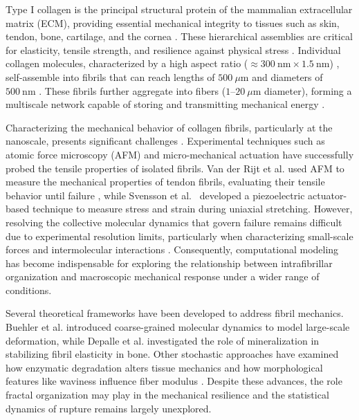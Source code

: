 \documentclass[aps,physrev,preprint,groupedaddress,linenumbers]{revtex4-2}
\begin{document}
Type I collagen is the principal structural protein of the mammalian extracellular matrix (ECM), providing essential mechanical integrity to tissues such as skin, tendon, bone, cartilage, and the cornea \cite{Silver2018,DavisonKotler2019,Tresoldi2013,Fedarko2014, RicoLlanos2021,Chen2015,Suki2021}. These hierarchical assemblies are critical for elasticity, tensile strength, and resilience against physical stress \cite{Silver2018,Amirrah2022}. Individual collagen molecules, characterized by a high aspect ratio ($\approx 300~\text{nm} \times 1.5~\text{nm}$) \cite{Gelse2003, Silver2018}, self-assemble into fibrils that can reach lengths of $500~\mu\text{m}$ and diameters of $500~\text{nm}$ \cite{Charvolin2019,Kadler1996, Parry1984}. These fibrils further aggregate into fibers ($1$--$20~\mu\text{m}$ diameter), forming a multiscale network capable of storing and transmitting mechanical energy \cite{Silver2008,Suki2021}.

Characterizing the mechanical behavior of collagen fibrils, particularly at the nanoscale, presents significant challenges \cite{Nalbach2022}. Experimental techniques such as atomic force microscopy (AFM) and micro-mechanical actuation have successfully probed the tensile properties of isolated fibrils. Van der Rijt et al. used AFM to measure the mechanical properties of tendon fibrils, evaluating their tensile behavior until failure \cite{vanderRijt2006}, while Svensson et al.~\cite{Svensson2018} developed a piezoelectric actuator-based technique to measure stress and strain during uniaxial stretching. However, resolving the collective molecular dynamics that govern failure remains difficult due to experimental resolution limits, particularly when characterizing small-scale forces and intermolecular interactions \cite{Andriotis2023}. Consequently, computational modeling has become indispensable for exploring the relationship between intrafibrillar organization and macroscopic mechanical response under a wider range of conditions.

Several theoretical frameworks have been developed to address fibril mechanics. Buehler et al. introduced coarse-grained molecular dynamics to model large-scale deformation, while Depalle et al. investigated the role of mineralization in stabilizing fibril elasticity in bone\cite{Buehler2006a,Buehler2006b,Buehler2008a,Buehler2008b,Depalle2016}. Other stochastic approaches have examined how enzymatic degradation alters tissue mechanics \cite{Arau2011} and how morphological features like waviness influence fiber modulus \cite{Deng2024}. Despite these advances, the role fractal organization may play in the mechanical resilience and the statistical dynamics of rupture remains largely unexplored.
\end{document}
